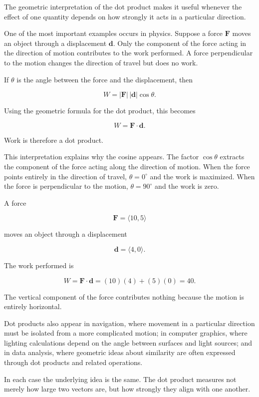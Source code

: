 The geometric interpretation of the dot product makes it useful whenever
the effect of one quantity depends on how strongly it acts in a
particular direction.

One of the most important examples occurs in physics. Suppose a force
$\mathbf{F}$ moves an object through a displacement $\mathbf{d}$. Only the
component of the force acting in the direction of motion contributes to
the work performed. A force perpendicular to the motion changes the
direction of travel but does no work.

If $\theta$ is the angle between the force and the displacement, then

\[
W
=
|\mathbf{F}|\,|\mathbf{d}|\cos\theta.
\]

Using the geometric formula for the dot product, this becomes

\[
\boxed{
W
=
\mathbf{F}\cdot\mathbf{d}.
}
\]

Work is therefore a dot product.

This interpretation explains why the cosine appears. The factor
$\cos\theta$ extracts the component of the force acting along the
direction of motion. When the force points entirely in the direction of
travel, $\theta=0^\circ$ and the work is maximized. When the force is
perpendicular to the motion, $\theta=90^\circ$ and the work is zero.

\begin{example}
A force

\[
\mathbf{F}
=
\langle 10,5\rangle
\]

moves an object through a displacement

\[
\mathbf{d}
=
\langle 4,0\rangle.
\]

The work performed is

\[
W
=
\mathbf{F}\cdot\mathbf{d}
=
(10)(4)+(5)(0)
=
40.
\]

The vertical component of the force contributes nothing because the
motion is entirely horizontal.
\end{example}

Dot products also appear in navigation, where movement in a particular
direction must be isolated from a more complicated motion; in computer
graphics, where lighting calculations depend on the angle between
surfaces and light sources; and in data analysis, where geometric ideas
about similarity are often expressed through dot products and related
operations.

In each case the underlying idea is the same. The dot product measures
not merely how large two vectors are, but how strongly they align with
one another.

